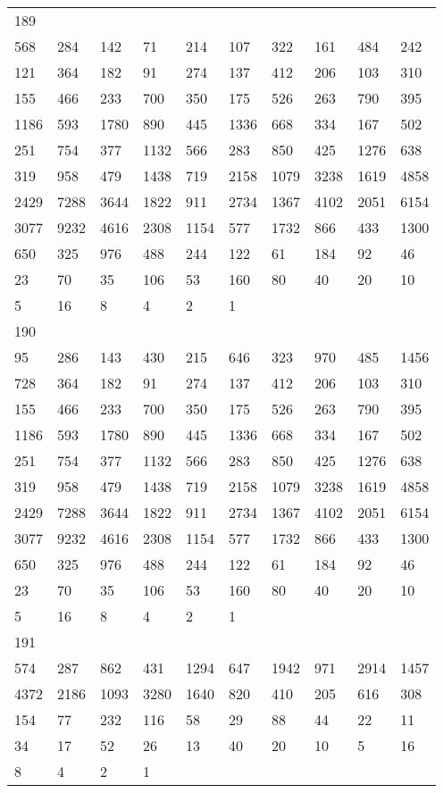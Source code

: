\begin{longtable}{*{10}{l}}
189&&&&&&&&&\\
568& 284& 142& 71& 214& 107& 322& 161& 484& 242\\
121& 364& 182& 91& 274& 137& 412& 206& 103& 310\\
155& 466& 233& 700& 350& 175& 526& 263& 790& 395\\
1186& 593& 1780& 890& 445& 1336& 668& 334& 167& 502\\
251& 754& 377& 1132& 566& 283& 850& 425& 1276& 638\\
319& 958& 479& 1438& 719& 2158& 1079& 3238& 1619& 4858\\
2429& 7288& 3644& 1822& 911& 2734& 1367& 4102& 2051& 6154\\
3077& 9232& 4616& 2308& 1154& 577& 1732& 866& 433& 1300\\
650& 325& 976& 488& 244& 122& 61& 184& 92& 46\\
23& 70& 35& 106& 53& 160& 80& 40& 20& 10\\
5& 16& 8& 4& 2& 1& \\

190&&&&&&&&&\\
95& 286& 143& 430& 215& 646& 323& 970& 485& 1456\\
728& 364& 182& 91& 274& 137& 412& 206& 103& 310\\
155& 466& 233& 700& 350& 175& 526& 263& 790& 395\\
1186& 593& 1780& 890& 445& 1336& 668& 334& 167& 502\\
251& 754& 377& 1132& 566& 283& 850& 425& 1276& 638\\
319& 958& 479& 1438& 719& 2158& 1079& 3238& 1619& 4858\\
2429& 7288& 3644& 1822& 911& 2734& 1367& 4102& 2051& 6154\\
3077& 9232& 4616& 2308& 1154& 577& 1732& 866& 433& 1300\\
650& 325& 976& 488& 244& 122& 61& 184& 92& 46\\
23& 70& 35& 106& 53& 160& 80& 40& 20& 10\\
5& 16& 8& 4& 2& 1& \\

191&&&&&&&&&\\
574& 287& 862& 431& 1294& 647& 1942& 971& 2914& 1457\\
4372& 2186& 1093& 3280& 1640& 820& 410& 205& 616& 308\\
154& 77& 232& 116& 58& 29& 88& 44& 22& 11\\
34& 17& 52& 26& 13& 40& 20& 10& 5& 16\\
8& 4& 2& 1& \\


\end{longtable}

